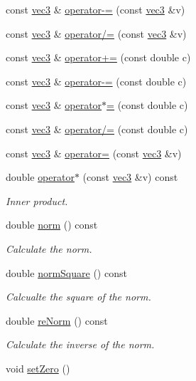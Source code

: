 \begin{DoxyCompactItemize}
\item 
const \mbox{\hyperlink{structvec3}{vec3}} \& \mbox{\hyperlink{structvec3_a6302bef90ffb5d572b9d452d902266c5}{operator-\/=}} (const \mbox{\hyperlink{structvec3}{vec3}} \&v)
\item 
const \mbox{\hyperlink{structvec3}{vec3}} \& \mbox{\hyperlink{structvec3_a4e52fc3e08391056d0e6e01a0375c395}{operator/=}} (const \mbox{\hyperlink{structvec3}{vec3}} \&v)
\item 
const \mbox{\hyperlink{structvec3}{vec3}} \& \mbox{\hyperlink{structvec3_aaec435599c22237b677b14fed2dad9d2}{operator+=}} (const double c)
\item 
const \mbox{\hyperlink{structvec3}{vec3}} \& \mbox{\hyperlink{structvec3_aef8422b6e70a53e4c10df464bb24507c}{operator-\/=}} (const double c)
\item 
const \mbox{\hyperlink{structvec3}{vec3}} \& \mbox{\hyperlink{structvec3_a401db8071cae874abdd0bc04846ee27f}{operator$\ast$=}} (const double c)
\item 
const \mbox{\hyperlink{structvec3}{vec3}} \& \mbox{\hyperlink{structvec3_ae6d5d20d8b6b4ae286c51b0cb10e5bd0}{operator/=}} (const double c)
\item 
const \mbox{\hyperlink{structvec3}{vec3}} \& \mbox{\hyperlink{structvec3_ad2cd7d64d02aa394c736ccc7054e5411}{operator=}} (const \mbox{\hyperlink{structvec3}{vec3}} \&v)
\item 
double \mbox{\hyperlink{structvec3_adf6b983e98aca9730b8cabce92a8affd}{operator$\ast$}} (const \mbox{\hyperlink{structvec3}{vec3}} \&v) const
\begin{DoxyCompactList}\small\item\em Inner product. \end{DoxyCompactList}\item 
double \mbox{\hyperlink{structvec3_a4cd4c90ed137753d0b6a2e83bb0170f7}{norm}} () const
\begin{DoxyCompactList}\small\item\em Calculate the norm. \end{DoxyCompactList}\item 
double \mbox{\hyperlink{structvec3_a2441867c3e439981a865affd7cbcc09c}{norm\+Square}} () const
\begin{DoxyCompactList}\small\item\em Calcualte the square of the norm. \end{DoxyCompactList}\item 
double \mbox{\hyperlink{structvec3_afd43645a0cc5c449ae4b98f6d93774d2}{re\+Norm}} () const
\begin{DoxyCompactList}\small\item\em Calculate the inverse of the norm. \end{DoxyCompactList}\item 
void \mbox{\hyperlink{structvec3_a4bfe30989d83b8f3b5b3d2177f804360}{set\+Zero}} ()
\end{DoxyCompactItemize}
